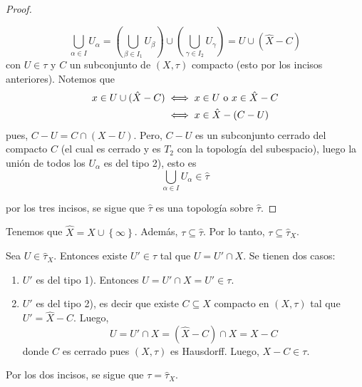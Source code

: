 \documentclass[12pt]{report}
\theoremstyle{largebreak}
\begin{document}
\begin{proof}
\begin{enumerate}
\begin{enumerate}
                \begin{equation*}
                    \bigcup_{\alpha\in I}U_\alpha=\left(\bigcup_{\beta\in I_1}U_\beta \right)\cup\left(\bigcup_{\gamma\in I_2}U_\gamma \right)
                    =U\cup(\hat{X}-C)
                \end{equation*}
                con $U\in\tau$ y $C$ un subconjunto de $(X,\tau)$ compacto (esto por los incisos anteriores). Notemos que
                \begin{equation*}
                    \begin{split}
                        x\in U\cup(\hat{X}-C)&\iff x\in U\textup{ o }x\in\hat{X}-C\\
                        &\iff x\in\hat{X}-(C-U)
                    \end{split}
                \end{equation*}
                pues, $C-U=C\cap (X-U)$. Pero, $C-U$ es un subconjunto cerrado del compacto $C$ (el cual es cerrado y es $T_2$ con la topología del subespacio), luego la unión de todos los $U_\alpha$ es del tipo 2), esto es
                \begin{equation*}
                    \bigcup_{\alpha\in I}U_\alpha\in\hat{\tau}
                \end{equation*}
            \end{enumerate}
        \end{enumerate}
        por los tres incisos, se sigue que $\hat{\tau}$ es una topología sobre $\hat{\tau}$.
    \end{proof}

    \begin{obs}
        Tenemos que $\hat{X}=X\cup\left\{\infty\right\}$. Además, $\tau\subseteq\hat{\tau}$. Por lo tanto, $\tau\subseteq\hat{\tau}_X$.

        Sea $U\in\hat{\tau}_X$. Entonces existe $U'\in\tau$ tal que $U=U'\cap X$. Se tienen dos casos:
        \begin{enumerate}
            \item $U'$ es del tipo 1). Entonces $U=U'\cap X=U'\in\tau$.
            \item $U'$ es del tipo 2), es decir que existe $C\subseteq X$ compacto en $(X,\tau)$ tal que $U'=\hat{X}-C$. Luego,
            \begin{equation*}
                U=U'\cap X=(\hat{X}-C)\cap X=X-C
            \end{equation*}
            donde $C$ es cerrado pues $(X,\tau)$ es Hausdorff. Luego, $X-C\in\tau$.
        \end{enumerate}
        Por los dos incisos, se sigue que $\tau=\hat{\tau}_X$.
    \end{obs}
\end{document}
